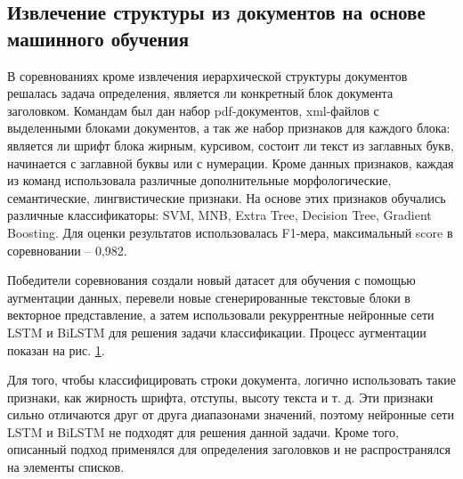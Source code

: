 \documentclass{ProcISPRAS}
\begin{document}
\subsection{Извлечение структуры из документов на основе машинного обучения}

В соревнованиях \cite{fintoc19comp} кроме извлечения иерархической структуры документов решалась задача определения, является ли конкретный блок документа заголовком. Командам был дан набор pdf-документов, xml-файлов с выделенными блоками документов, а так же набор признаков для каждого блока: является ли шрифт блока жирным, курсивом, состоит ли текст из заглавных букв, начинается с заглавной буквы или с нумерации. Кроме данных признаков, каждая из команд использовала различные дополнительные морфологические, семантические, лингвистические признаки. На основе этих признаков обучались различные классификаторы: SVM, MNB, Extra Tree, Decision Tree, Gradient Boosting. Для оценки результатов использовалась F1-мера, максимальный score в соревновании -- 0,982.

Победители соревнования \cite{fintoc19tian} создали новый датасет для обучения с помощью аугментации данных, перевели новые сгенерированные текстовые блоки в векторное представление, а затем использовали рекуррентные нейронные сети LSTM и BiLSTM для решения задачи классификации. Процесс аугментации показан на рис. \ref{fig:augmentation}.

\begin{figure}[ht]
    \label{fig:augmentation}
\end{figure}

Для того, чтобы классифицировать строки документа, логично использовать такие признаки, как жирность шрифта, отступы, высоту текста и т. д. Эти признаки сильно отличаются друг от друга диапазонами значений, поэтому нейронные сети LSTM и BiLSTM не подходят для решения данной задачи. Кроме того, описанный подход применялся для определения заголовков и не распространялся на элементы списков.
\end{document}
